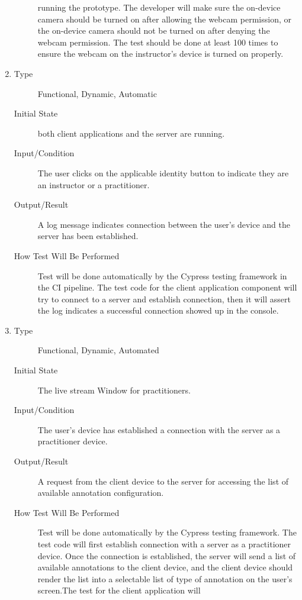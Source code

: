 \documentclass[12pt, titlepage]{article}
\begin{document}
\begin{enumerate}[FR-T1]
\begin{description}
    running the prototype. The developer will make sure the on-device camera
    should be turned on after allowing the webcam permission, or the on-device
    camera should not be turned on after denying the webcam permission. The test
    should be done at least 100 times to ensure the webcam on the instructor’s
    device is turned on properly.
  \end{description}
\item \label{FRT3}
  \begin{description}
  \item[Type] Functional, Dynamic, Automatic
  \item[Initial State] both client applications and the server are running.
  \item[Input/Condition] The user clicks on the applicable identity button to
    indicate they are an instructor or a practitioner.
  \item[Output/Result] A log message indicates connection between the user’s device
    and the server has been established.
  \item[How Test Will Be Performed] Test will be done automatically by the Cypress
    testing framework in the CI pipeline. The test code for the client
    application component will try to connect to a server and establish
    connection, then it will assert the log indicates a successful connection
    showed up in the console.
  \end{description}
\item \label{FRT4}
  \begin{description}
  \item[Type] Functional, Dynamic, Automated
  \item[Initial State] The live stream Window for practitioners.
  \item[Input/Condition] The user’s device has established a connection with the
    server as a practitioner device.
  \item[Output/Result] A request from the client device to the server for accessing
    the list of available annotation configuration.
  \item[How Test Will Be Performed] Test will be done automatically by the Cypress
    testing framework. The test code will first establish connection with a
    server as a practitioner device. Once the connection is established, the
    server will send a list of available annotations to the client device, and
    the client device should render the list into a selectable list of type of
    annotation on the user's screen.The test for the client application will

\end{description}
\end{enumerate}
\end{document}
